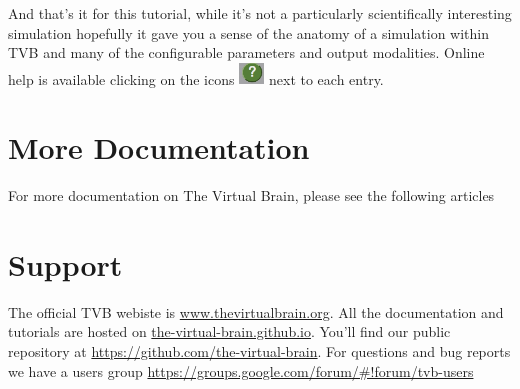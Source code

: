 \documentclass{tufte-handout}
\begin{document}
And that's it for this tutorial, while it's not a particularly scientifically
interesting simulation hopefully it gave you a sense of the anatomy of a
simulation within TVB and many of the configurable parameters and output
modalities. Online help is available clicking on the icons \includegraphics[width=0.05\textwidth]{butt_green_help} next to each entry.


\section{More Documentation}\label{sec:more-doc}
For more documentation on The Virtual Brain, please see the following articles \citep{Ghosh_2008, Sanz-Leon_2013, Spiegler_2013, Woodman_2014, Jirsa_2010b}


\section{Support}\label{sec:support}

The official TVB webiste is \url{www.thevirtualbrain.org}.  
All the documentation and tutorials are hosted on \url{the-virtual-brain.github.io}.
You'll find our public  repository at \url{https://github.com/the-virtual-brain}. 
For questions and bug reports we have a users group \url{https://groups.google.com/forum/#!forum/tvb-users}



\end{document}
